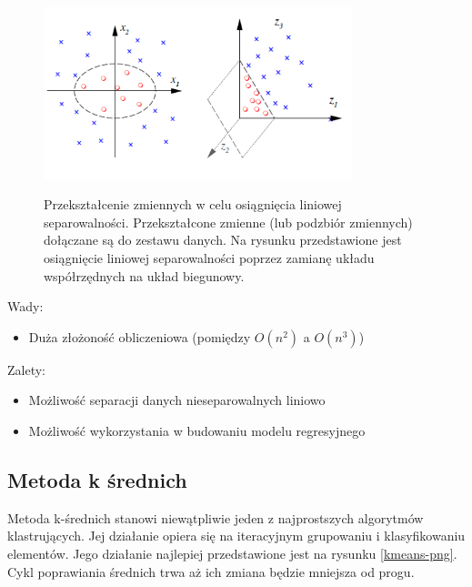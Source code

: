 \documentclass[12pt,a4paper,oneside]{report} %
\begin{document}
\begin{figure}
\centering
\includegraphics[width=0.8\textwidth]{kernel-trick.png}
\label{kernel-trick-png}
\caption{Przekształcenie zmiennych w celu osiągnięcia liniowej separowalności. Przekształcone zmienne (lub podzbiór zmiennych) dołączane są do zestawu danych. Na rysunku przedstawione jest osiągnięcie liniowej separowalności poprzez zamianę układu współrzędnych na układ biegunowy.}
\end{figure}\par
\vspace{0.5cm}
Wady:\par
\begin{itemize}
\item Duża złożoność obliczeniowa (pomiędzy $O(n^2)$ a $O(n^3)$)
\end{itemize}\par
Zalety:\par
\begin{itemize}
\item Możliwość separacji danych nieseparowalnych liniowo
\item Możliwość wykorzystania w budowaniu modelu regresyjnego
\end{itemize}\par

\subsection{Metoda k średnich}

Metoda k-średnich stanowi niewątpliwie jeden z najprostszych algorytmów klastrujących. Jej działanie opiera się na iteracyjnym grupowaniu i klasyfikowaniu elementów. Jego działanie najlepiej przedstawione jest na rysunku \ref{kmeans-png}. Cykl poprawiania średnich trwa aż ich zmiana będzie mniejsza od progu.\par
\end{document}
